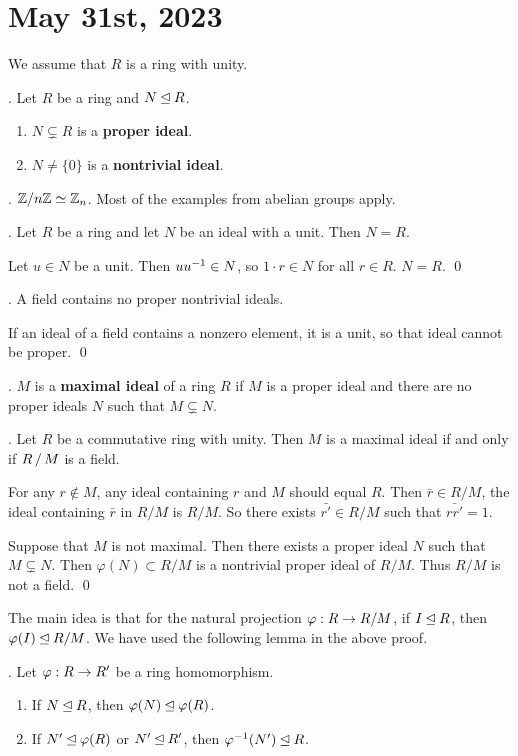 \section*{May 31st, 2023}


We assume that \(R\) is a ring with unity.

. Let \(R\) be a ring and \(N \unlhd R\).
\begin{enumerate}
    \item \(N \subsetneq R\) is a \textbf{proper ideal}.
    \item \(N \neq \{0\}\) is a \textbf{nontrivial ideal}.
\end{enumerate}

\ex. \(\mathbb{Z} / n\mathbb{Z} \simeq \mathbb{Z}_n\). Most of the examples from abelian groups apply.

\thm. Let \(R\) be a ring and let \(N\) be an ideal with a unit. Then \(N = R\).

\pf Let \(u \in N\) be a unit. Then \(u u^{-1} \in N\), so \(1\cdot r \in N\) for all \(r \in R\). \(N = R\). \qed

\cor. A field contains no proper nontrivial ideals.

\pf If an ideal of a field contains a nonzero element, it is a unit, so that ideal cannot be proper. \qed

.  \(M\) is a \textbf{maximal ideal} of a ring \(R\) if \(M\) is a proper ideal and there are no proper ideals \(N\) such that \(M \subsetneq N\).

\thm. Let \(R\) be a commutative ring with unity. Then \(M\) is a maximal ideal if and only if \(R\operatorname{/} M\) is a field.

\pf \note{\mimp} For any \(r \notin M\), any ideal containing \(r\) and \(M\) should equal \(R\). Then \(\bar{r} \in R/M\), the ideal containing \(\bar{r}\) in \(R/M\) is \(R/M\). So there exists \(\bar{r'} \in R/M\) such that \(\bar{rr'} = 1\).

\note{\mimpd} Suppose that \(M\) is not maximal. Then there exists a proper ideal \(N\) such that \(M \subsetneq N\). Then \(\varphi(N) \subset R/M\) is a nontrivial proper ideal of \(R/M\). Thus \(R/M\) is not a field. \qed

The main idea is that for the natural projection \(\varphi: R \rightarrow R/M\), if \(I \unlhd R\), then \(\varphi(I) \unlhd R/M\). We have used the following lemma in the above proof.

\lemma. Let \(\varphi : R \rightarrow R'\) be a ring homomorphism.
\begin{enumerate}
    \item If \(N \unlhd R\), then \(\varphi(N) \unlhd \varphi(R)\).
    \item If \(N' \unlhd \varphi(R)\) or \(N' \unlhd R'\), then \(\varphi^{-1}(N') \unlhd R\).
\end{enumerate}

